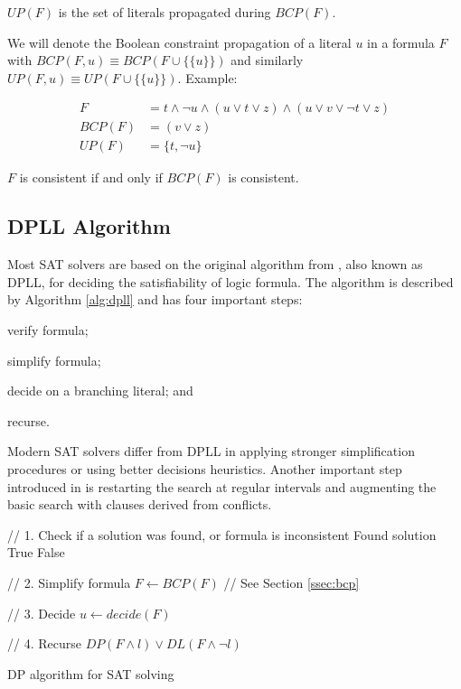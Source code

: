 \begin{mydef}
$UP(F)$ is the set of literals propagated during $BCP(F)$.
\end{mydef}

We will denote the Boolean constraint propagation of a literal $u$ in a
formula $F$ with $BCP(F, u) \equiv BCP(F \cup \{\{ u \}\})$
and similarly $UP(F, u) \equiv UP(F \cup \{\{ u \}\})$. Example:

\begin{align}
  F &= t \land \neg u \land (u \lor t \lor z) \land (u \lor v \lor \neg t \lor z) \\
  BCP(F) &= (v \lor z) \\
  UP(F) &= \{ t, \neg u \}
\end{align}

\begin{myprop}
  $F$ is consistent if and only if $BCP(F)$ is consistent.
\end{myprop}


\subsection{DPLL Algorithm}
\label{ssec:dpll}

Most SAT solvers are based on the original algorithm from
\cite{Davis:1962:MPT:368273.368557}, also known as DPLL, for deciding
the satisfiability of logic formula.  The algorithm is described
by Algorithm \ref{alg:dpll} and has four important steps:
\begin{inparaenum}[1)]
  \item verify formula;
  \item simplify formula;
  \item decide on a branching literal; and
  \item recurse.
\end{inparaenum}

Modern SAT solvers differ from DPLL in applying
stronger simplification procedures or using better
decisions heuristics. Another important step introduced in
\cite{Marques-silva99grasp:a} is restarting the search at regular
intervals and augmenting the basic search with clauses derived
from conflicts.


\begin{algorithm}
  \begin{algorithmic}

    // 1. Check if a solution was found, or formula is inconsistent
      \PRINT Found solution
      \RETURN True
    \ENDIF
      \RETURN False
    \ENDIF

    // 2. Simplify formula
    \STATE $F \gets BCP(F)$ // See Section \ref{ssec:bcp}

    // 3. Decide
    \STATE $u \gets decide(F)$

    // 4. Recurse
    \RETURN $DP(F \land l) \lor DL(F \land \neg l)$
  \end{algorithmic}

  \caption{DP algorithm for SAT solving}
  \label{alg:dpll}
\end{algorithm}


